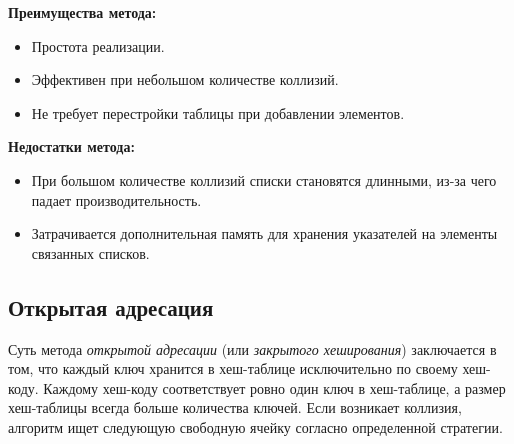 \begin{minipage}[t]{0.45\textwidth}
	\textbf{Преимущества метода:}
	\begin{itemize}[label=$\triangleright$, leftmargin=*, font=\scriptsize, noitemsep, topsep=0pt, , partopsep=0pt]
		\item {\footnotesize Простота реализации.}
		\item {\footnotesize Эффективен при небольшом количестве коллизий.}
		\item {\footnotesize Не требует перестройки таблицы при добавлении элементов.}
	\end{itemize}
\end{minipage}
\hspace{1cm}
\begin{minipage}[t]{0.45\textwidth}
	\textbf{Недостатки метода:}
	\begin{itemize}[label=$\triangleright$, leftmargin=*, font=\scriptsize, noitemsep, topsep=0pt, , partopsep=0pt]
		\item {\footnotesize При большом количестве коллизий списки становятся длинными, из-за чего падает производительность.}
		\item {\footnotesize Затрачивается дополнительная память для хранения указателей на элементы связанных списков.}
	\end{itemize}
\end{minipage}

\subsection{Открытая адресация} \label{sec:open_addressing}

Суть метода \textit{открытой адресации} (или \textit{закрытого хеширования}) заключается в том, что каждый ключ хранится в хеш-таблице исключительно по своему хеш-коду. Каждому хеш-коду соответствует ровно один ключ в хеш-таблице, а размер хеш-таблицы всегда больше количества ключей. Если возникает коллизия, алгоритм ищет следующую свободную ячейку согласно определенной стратегии.
\vspace{5pt}


